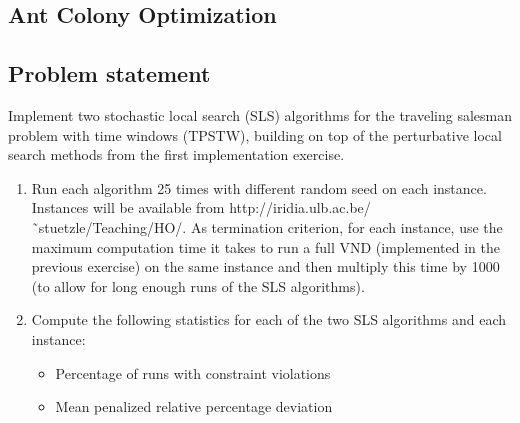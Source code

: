 
\newpage
\begin{homeworkProblem}
\section{Ant Colony Optimization} \label{aco}
\subsection{Problem statement}
Implement two stochastic local search (SLS) algorithms for the traveling salesman problem with time windows (TPSTW), building on top of the perturbative local search methods from the first implementation exercise.
\begin{enumerate}
  \item Run each algorithm 25 times with different random seed on each instance. Instances will be available from http://iridia.ulb.ac.be/˜stuetzle/Teaching/HO/. As termination criterion, for each instance, use the maximum computation time it takes to run a full VND (implemented in the previous exercise) on the same instance and then multiply this time by 1000 (to allow for long enough runs of the SLS algorithms).
 \item Compute the following statistics for each of the two SLS algorithms and each instance:
 \begin{itemize}
   \item Percentage of runs with constraint violations
   \item Mean penalized relative percentage deviation
 \end{itemize}


\end{enumerate}
\end{homeworkProblem}
